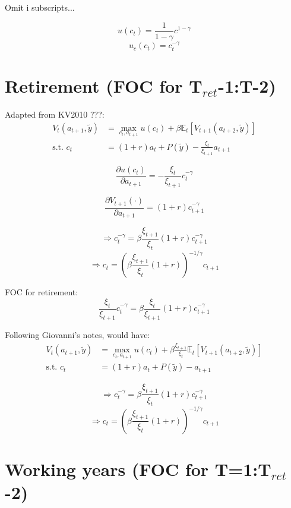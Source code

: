 \documentclass[11pt]{article}
\begin{document}
Omit i subscripts...

$$ u(c_t) = \frac{1}{1-\gamma} c^{1-\gamma} $$
$$ u_c(c_t) = c_t^{-\gamma} $$

\section*{Retirement (FOC for T$_{ret}$-1:T-2)}

Adapted from KV2010 ???:
\begin{equation*}
\begin{split}
 V_{t}(a_{t+1}, \tilde{y}) &= \max_{c_t,a_{t+1}} u(c_{t}) + \beta \mathbb{E}_t[V_{t+1}(a_{t+2}, \tilde{y})] \\
  \text{s.t. } c_t &= (1+r) a_{t}+P(\tilde{y}) - \frac{\xi_{t}}{\xi_{t+1}} a_{t+1}
\end{split}
\end{equation*}

$$ \frac{\partial{u(c_t)}}{\partial{a_{t+1}}} = -\frac{\xi_t}{\xi_{t+1}} c_t^{-\gamma} $$

$$ \frac{\partial{V_{t+1}(\cdot)}}{\partial{a_{t+1}}} = (1+r) c_{t+1}^{-\gamma} $$

$$ \Rightarrow c_t^{-\gamma} = \beta \frac{\xi_{t+1}}{\xi_t} (1+r) c_{t+1}^{-\gamma} $$
$$ \Rightarrow c_t = \left(\beta \frac{\xi_{t+1}}{\xi_t} (1+r) \right)^{-1/\gamma} c_{t+1} $$

FOC for retirement:
$$ \frac{\xi_t}{\xi_{t+1}} c_t^{-\gamma} = \beta \frac{\xi_t}{\xi_{t+1}} (1+r) c_{t+1}^{-\gamma} $$


Following Giovanni's notes, would have:
\begin{equation*}
\begin{split}
 V_{t}(a_{t+1}, \tilde{y}) &= \max_{c_t,a_{t+1}} u(c_{t}) + \beta \frac{\xi_{t+1}}{\xi_{t}} \mathbb{E}_t[V_{t+1}(a_{t+2}, \tilde{y})] \\
 \text{s.t. } c_t &= (1+r) a_{t}+P(\tilde{y}) - a_{t+1}
\end{split}
\end{equation*}

$$ \Rightarrow c_t^{-\gamma} = \beta \frac{\xi_{t+1}}{\xi_t} (1+r) c_{t+1}^{-\gamma} $$
$$ \Rightarrow c_t = \left(\beta \frac{\xi_{t+1}}{\xi_t} (1+r) \right)^{-1/\gamma} c_{t+1} $$


\section*{Working years (FOC for T=1:T$_{ret}$-2)}
\end{document}

